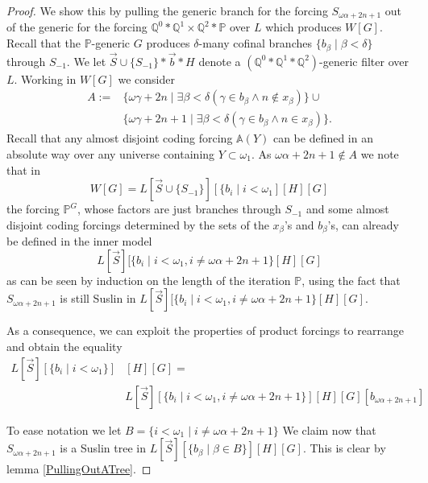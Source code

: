 \documentclass[a4paper,11pt]{article}
\newcommand{\forceP}{\mathbb{P}}
\newcommand{\forceQ}{\mathbb{Q}}
\begin{document}
\begin{proof}
We show this by pulling the generic branch for the forcing $S_{\omega \alpha + 2n+1}$ out of the generic for the  forcing $\forceQ^0 \ast \forceQ^1 \times \forceQ^2 \ast \forceP$ over $L$ which produces $W[G]$. 
Recall that the $\forceP$-generic $G$ produces $\delta$-many cofinal branches $\{b_{\beta} \mid \beta < \delta\}$ through $S_{-1}$. We let $\vec{S} \cup \{S_{-1}\}
 \ast \vec{b} \ast H$ denote a $(\forceQ^0 \ast \forceQ^1 \ast \forceQ^2)$-generic filter over $L$. Working in $W[G]$ we consider 
 \begin{align*}
A:= &\{ \omega \gamma +2n \mid \exists \beta < \delta (\gamma \in b_{\beta} \land n \notin x_{\beta}) \} \cup \\& \{\omega \gamma + 2n+1 \mid \exists \beta< \delta (\gamma \in b_{\beta} \land n \in x_{\beta} )\}.
\end{align*}
Recall that any almost disjoint coding forcing $\mathbb{A} (Y)$ can be defined in an absolute way over any universe containing $Y\subset \omega_1$.
As $\omega\alpha +2n+1 \notin A$  we note that in
\[ W[G]= L[\vec{S} \cup \{ S_{-1} \} ] [\{ b_i \mid i < \omega_1] [H] [G]\]
the forcing $\forceP^G$, whose factors are just branches through $S_{-1}$ and some almost disjoint coding forcings determined by the sets of the $x_{\beta}$'s and $b_{\beta}$'s, can already be defined in the inner model
\[ L[\vec{S}] [ \{ b_i \mid i < \omega_1, i \ne \omega\alpha +2n+1 \} [H] [G] \]
as can be seen by induction on the length of the iteration $\forceP$, using the fact that
$S_{\omega \alpha+2n+1}$ is still Suslin in $L[\vec{S}]  [\{ b_i \mid i < \omega_1, i \ne \omega\alpha +2n+1 \} [H] [G] $.

As a consequence, we can exploit the properties of product forcings to rearrange and obtain the equality
\begin{align*}
L[\vec{S} ] [ \{ b_i \mid i < \omega_1 \} ]& [H] [G]= \\& L[\vec{S}]  [ \{ b_i \mid i < \omega_1, i \ne \omega\alpha +2n+1 \} ] [H] [G] [b_{\omega\alpha +2n+1}] 
\end{align*}




To ease notation we let $B= \{ i <\omega_1 \mid i \ne \omega \alpha +2n +1 \}$
We claim now that $S_{\omega\alpha +2n+1}$ is a Suslin tree in $L[\vec{S} ] [\{b_{\beta} \mid \beta \in B \} ] [H] [G]$. This is clear by lemma \ref{PullingOutATree}.



\end{proof}
\end{document}

